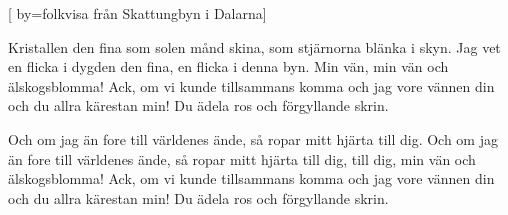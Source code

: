 


[ 	%
	by={folkvisa från Skattungbyn i Dalarna}]		%
	
\beginverse*		%
Kristallen den fina som solen månd skina,
som stjärnorna blänka i skyn.
Jag vet en flicka i dygden den fina,
en flicka i denna byn.
Min vän, min vän och älskogsblomma!
Ack, om vi kunde tillsammans komma
och jag vore vännen din
och du allra kärestan min!
Du ädela ros och förgyllande skrin.
\endverse			%

\beginverse*		%
Och om jag än fore till världenes ände,
så ropar mitt hjärta till dig.
Och om jag än fore till världenes ände,
så ropar mitt hjärta till dig,
till dig, min vän och älskogsblomma!
Ack, om vi kunde tillsammans komma
och jag vore vännen din
och du allra kärestan min!
Du ädela ros och förgyllande skrin.
\endverse			%
\endsong			%
